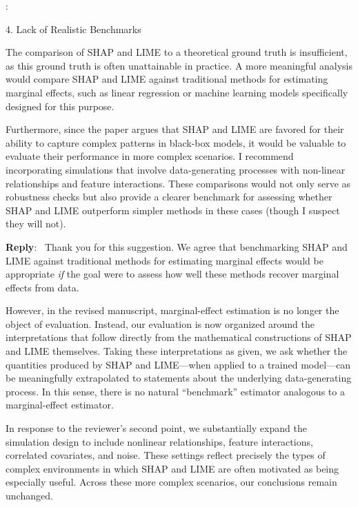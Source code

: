 \documentclass[11pt]{article}
\newcounter{se}[section]
\newcounter{reviewer}
\newcounter{point}[reviewer]
\renewcommand{\thepoint}{R\,\thereviewer.\arabic{point}}
\newenvironment{point}{
    \refstepcounter{point} \bigskip \noindent {\textbf{\thepoint}}: \rmfamily \itshape
}{\medskip}
\newenvironment{reply}
 {\par\medskip \noindent \begin{sf}\textbf{Reply}:\ }
 {\medskip \end{sf}}
\begin{document}
\begin{point}
4.      Lack of Realistic Benchmarks

The comparison of SHAP and LIME to a theoretical ground truth is insufficient, as this ground truth is often unattainable in practice. A more meaningful analysis would compare SHAP and LIME against traditional methods for estimating marginal effects, such as linear regression or machine learning models specifically designed for this purpose.

Furthermore, since the paper argues that SHAP and LIME are favored for their ability to capture complex patterns in black-box models, it would be valuable to evaluate their performance in more complex scenarios. I recommend incorporating simulations that involve data-generating processes with non-linear relationships and feature interactions. These comparisons would not only serve as robustness checks but also provide a clearer benchmark for assessing whether SHAP and LIME outperform simpler methods in these cases (though I suspect they will not).
\end{point}

\begin{reply}
Thank you for this suggestion. We agree that benchmarking SHAP and LIME against traditional methods for estimating marginal effects would be appropriate \emph{if} the goal were to assess how well these methods recover marginal effects from data.

However, in the revised manuscript, marginal-effect estimation is no longer the object of evaluation. Instead, our evaluation is now organized around the interpretations that follow directly from the mathematical constructions of SHAP and LIME themselves. Taking these interpretations as given, we ask whether the quantities produced by SHAP and LIME—when applied to a trained model—can be meaningfully extrapolated to statements about the underlying data-generating process. In this sense, there is no natural “benchmark” estimator analogous to a marginal-effect estimator.




In response to the reviewer’s second point, we substantially expand the simulation design to include nonlinear relationships, feature interactions, correlated covariates, and noise. These settings reflect precisely the types of complex environments in which SHAP and LIME are often motivated as being especially useful.
Across these more complex scenarios, our conclusions remain unchanged. %

\end{reply}
\end{document}
